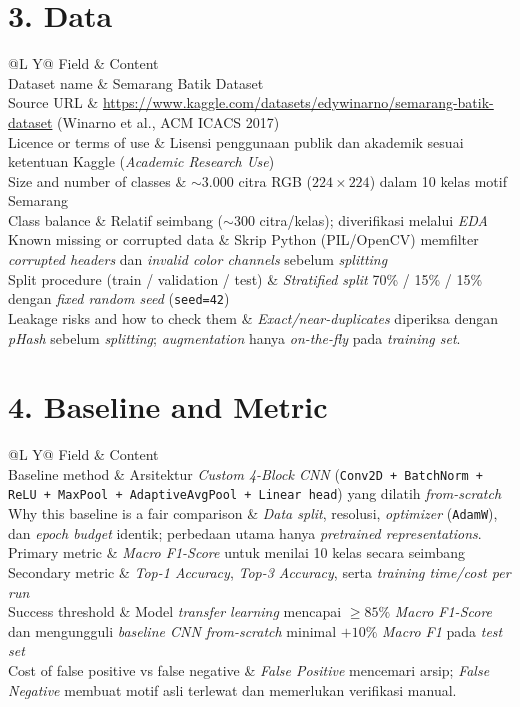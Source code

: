 \documentclass[9pt,a4paper]{extarticle}
\makeatletter
\renewcommand{\arraystretch}{0.92}
\newcommand{\proposalTable}[1]{%
    \renewcommand{\arraystretch}{0.94}%
    \begin{tabularx}{\textwidth}{@{}L Y@{}}
    \toprule[0.7pt]
    \textcolor{muted}{Field} & \textcolor{muted}{Content}\\
    \midrule
    #1
    \bottomrule[0.7pt]
    \end{tabularx}%
}
\makeatother
\begin{document}
\section*{3. Data}
\proposalTable{%
    Dataset name & Semarang Batik Dataset\\
    Source URL & \url{https://www.kaggle.com/datasets/edywinarno/semarang-batik-dataset} (Winarno et al., ACM ICACS 2017)\\
    Licence or terms of use & Lisensi penggunaan publik dan akademik sesuai ketentuan Kaggle (\textit{Academic Research Use})\\
    Size and number of classes & $\sim 3.000$ citra RGB ($224\times224$) dalam 10 kelas motif Semarang\\
    Class balance & Relatif seimbang ($\sim 300$ citra/kelas); diverifikasi melalui \textit{EDA}\\
    Known missing or corrupted data & Skrip Python (PIL/OpenCV) memfilter \textit{corrupted headers} dan \textit{invalid color channels} sebelum \textit{splitting}\\
    Split procedure (train / validation / test) & \textit{Stratified split} 70\% / 15\% / 15\% dengan \textit{fixed random seed} (\texttt{seed=42})\\
    Leakage risks and how to check them & \textit{Exact/near-duplicates} diperiksa dengan \textit{pHash} sebelum \textit{splitting}; \textit{augmentation} hanya \textit{on-the-fly} pada \textit{training set}.\\
}

\section*{4. Baseline and Metric}
\proposalTable{%
    Baseline method & Arsitektur \textit{Custom 4-Block CNN} (\texttt{Conv2D + BatchNorm + ReLU + MaxPool + AdaptiveAvgPool + Linear head}) yang dilatih \textit{from-scratch}\\
    Why this baseline is a fair comparison & \textit{Data split}, resolusi, \textit{optimizer} (\texttt{AdamW}), dan \textit{epoch budget} identik; perbedaan utama hanya \textit{pretrained representations}.\\
    Primary metric & \textit{Macro F1-Score} untuk menilai 10 kelas secara seimbang\\
    Secondary metric & \textit{Top-1 Accuracy}, \textit{Top-3 Accuracy}, serta \textit{training time/cost per run}\\
    Success threshold & Model \textit{transfer learning} mencapai $\ge 85\%$ \textit{Macro F1-Score} dan mengungguli \textit{baseline CNN from-scratch} minimal $+10\%$ \textit{Macro F1} pada \textit{test set}\\
    Cost of false positive vs false negative & \textit{False Positive} mencemari arsip; \textit{False Negative} membuat motif asli terlewat dan memerlukan verifikasi manual.\\
}
\end{document}
